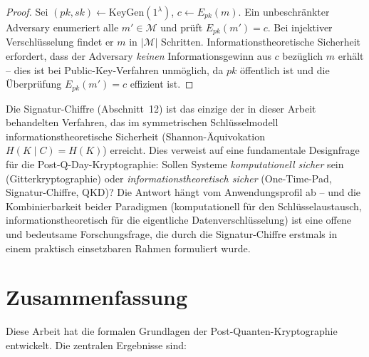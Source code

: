 ﻿\documentclass[a4paper,12pt]{article}
\theoremstyle{definition}
\begin{document}
\begin{proof}
Sei $(pk, sk) \leftarrow \mathrm{KeyGen}(1^\lambda)$,
$c \leftarrow E_{pk}(m)$. Ein unbeschr\"ankter Adversary enumeriert
alle $m' \in \mathcal{M}$ und pr\"uft $E_{pk}(m') = c$.
Bei injektiver Verschl\"usselung findet er $m$ in $|\mathcal{M}|$
Schritten. Informationstheoretische Sicherheit erfordert, dass der
Adversary \emph{keinen} Informationsgewinn aus $c$ bez\"uglich $m$
erh\"alt -- dies ist bei Public-Key-Verfahren unm\"oglich, da $pk$
\"offentlich ist und die \"Uberpr\"ufung $E_{pk}(m') = c$
effizient ist.
\end{proof}

Die Signatur-Chiffre (Abschnitt~12) ist das einzige der in dieser
Arbeit behandelten Verfahren, das im symmetrischen Schlüsselmodell
informationstheoretische Sicherheit (Shannon-Äquivokation
$H(K \mid C) = H(K)$) erreicht. Dies verweist auf eine fundamentale
Designfrage für die Post-Q-Day-Kryptographie: Sollen Systeme
\emph{komputationell sicher} sein (Gitterkryptographie) oder
\emph{informationstheoretisch sicher} (One-Time-Pad, Signatur-Chiffre,
QKD)? Die Antwort hängt vom Anwendungsprofil ab -- und die
Kombinierbarkeit beider Paradigmen (komputationell für den
Schlüsselaustausch, informationstheoretisch für die eigentliche
Datenverschlüsselung) ist eine offene und bedeutsame
Forschungsfrage, die durch die Signatur-Chiffre erstmals
in einem praktisch einsetzbaren Rahmen formuliert wurde.

\section{Zusammenfassung}

Diese Arbeit hat die formalen Grundlagen der Post-Quanten-Kryptographie
entwickelt. Die zentralen Ergebnisse sind:
\end{document}
